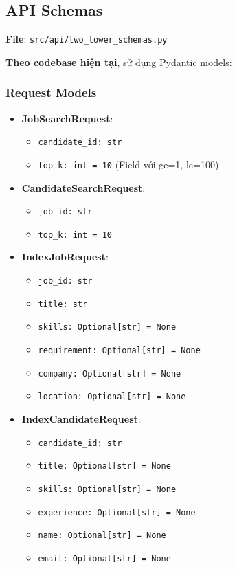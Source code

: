 \subsection{API Schemas}

\textbf{File}: \texttt{src/api/two\_tower\_schemas.py}

\textbf{Theo codebase hiện tại}, sử dụng Pydantic models:

\subsubsection{Request Models}

\begin{itemize}
    \item \textbf{JobSearchRequest}:
    \begin{itemize}
        \item \texttt{candidate\_id: str}
        \item \texttt{top\_k: int = 10} (Field với ge=1, le=100)
    \end{itemize}
    
    \item \textbf{CandidateSearchRequest}:
    \begin{itemize}
        \item \texttt{job\_id: str}
        \item \texttt{top\_k: int = 10}
    \end{itemize}
    
    \item \textbf{IndexJobRequest}:
    \begin{itemize}
        \item \texttt{job\_id: str}
        \item \texttt{title: str}
        \item \texttt{skills: Optional[str] = None}
        \item \texttt{requirement: Optional[str] = None}
        \item \texttt{company: Optional[str] = None}
        \item \texttt{location: Optional[str] = None}
    \end{itemize}
    
    \item \textbf{IndexCandidateRequest}:
    \begin{itemize}
        \item \texttt{candidate\_id: str}
        \item \texttt{title: Optional[str] = None}
        \item \texttt{skills: Optional[str] = None}
        \item \texttt{experience: Optional[str] = None}
        \item \texttt{name: Optional[str] = None}
        \item \texttt{email: Optional[str] = None}
    \end{itemize}
    

\end{itemize}
